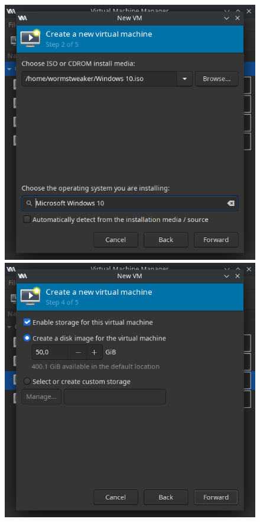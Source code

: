 \documentclass[11pt]{article}
\begin{document}
\begin{figure}[h]
	\centering
	\begin{minipage}[b]{0.4\textwidth}
		\includegraphics[width=\textwidth]{images/vm-iso-selection.png}
	\end{minipage}
	\begin{minipage}[b]{0.4\textwidth}
		\includegraphics[width=\textwidth]{images/vm-disk-creation.png}
	\end{minipage}
\end{figure}
\end{document}
